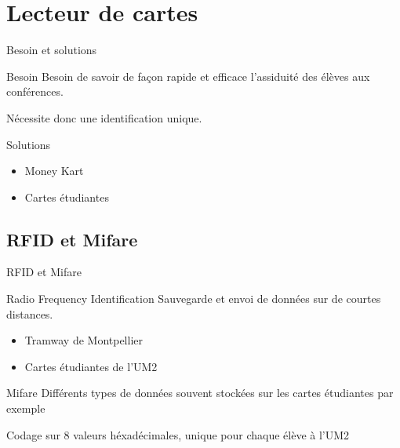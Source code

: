 \section{Lecteur de cartes}
\begin{frame}{Besoin et solutions}
	\begin{block}{Besoin}
        Besoin de savoir de façon rapide et efficace l'assiduité des élèves aux 
        conférences.

        Nécessite donc une identification unique.
	\end{block}

	\begin{block}{Solutions}
	    \begin{itemize}
            \item Money Kart
            \item Cartes étudiantes
	    \end{itemize}
	\end{block}
\end{frame}


\subsection{RFID et Mifare}
\begin{frame}{RFID et Mifare}
	\begin{block}{Radio Frequency Identification}
        Sauvegarde et envoi de données sur de courtes distances.

	    \begin{itemize}
            \item Tramway de Montpellier
            \item Cartes étudiantes de l'UM2
	    \end{itemize}
	\end{block}

	\begin{block}{Mifare}
        Différents types de données souvent stockées sur les cartes étudiantes par
        exemple

        Codage sur 8 valeurs héxadécimales, unique pour chaque élève à l'UM2
	\end{block}
\end{frame}



